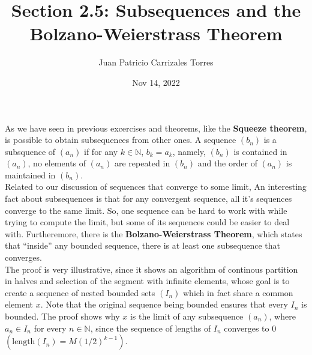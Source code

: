 \documentclass[12pt]{article}
\newcommand{\N}{\mathbb{N}}
\begin{document}
  
\title{Section 2.5: Subsequences and the Bolzano-Weierstrass Theorem}
   \author{Juan Patricio Carrizales Torres}
     \date{Nov 14, 2022}
       \maketitle

     As we have seen in previous excercises and theorems, like the \textbf{Squeeze theorem}, is possible to obtain subsequences from other ones. A sequence $(b_{n})$ is a subsquence of $(a_{n})$ if for any $k\in \N$, $b_{k}=a_{k}$, namely, $(b_{n})$ is contained in $(a_{n})$, no elements of $(a_{n})$ are repeated in $(b_{n})$ and the order of $(a_{n})$ is maintained in $(b_{n})$.\\
     
     Related to our discussion of sequences that converge to some limit, An interesting fact about subsequences is that for any convergent sequence, all it's sequences converge to the same limit. So, one sequence can be hard to work with while trying to compute the limit, but some of its sequences could be easier to deal with. Furtheremore, there is the \textbf{Bolzano-Weierstrass Theorem}, which states that ``inside'' any bounded sequence, there is at least one subsequence that converges.\\

     The proof is very illustrative, since it shows an algorithm of continous partition in halves and selection of the segment with infinite elements, whose goal is to create a sequence of nested bounded sets $(I_{n})$ which in fact share a common element $x$. Note that the original sequence being bounded ensures that every $I_{n}$ is bounded. The proof shows why $x$ is the limit of any subsequence $(a_{n})$, where $a_{n} \in I_{n}$ for every $n\in \N$, since the sequence of lengths of $I_{n}$ converges to $0$ $(\text{length}(I_{n}) = M(1/2)^{k-1})$.

       
\end{document}
